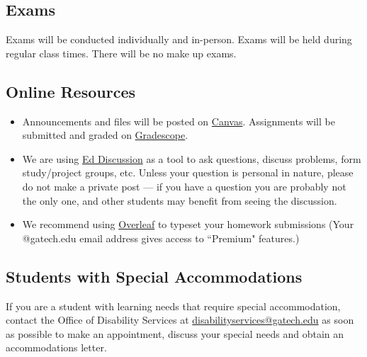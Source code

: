 \documentclass{article}
\begin{document}
\subsection*{Exams}
    Exams will be conducted individually and in-person. Exams will be held during regular class times. There will be no make up exams.

\subsection*{Online Resources}
    \begin{itemize}
        \item Announcements and files will be posted on \href{https://www.instructure.com/canvas}{Canvas}. Assignments will be submitted and graded on \href{https://www.gradescope.com/}{Gradescope}.
        \item We are using \href{https://edstem.org/}{Ed Discussion} as a tool to ask questions, discuss problems, form study/project groups, etc. Unless your question is personal in nature, please do not make a private post — if you have a question you are probably not the only one, and other students may benefit from seeing the discussion.
        \item We recommend using \href{https://overleaf.com}{Overleaf} to typeset your homework submissions (Your @gatech.edu email address gives access to ``Premium" features.)
    \end{itemize}

\subsection*{Students with Special Accommodations}
If you are a student with learning needs that require special accommodation, contact the Office of Disability Services at \url{disabilityservices@gatech.edu} as soon as possible to make an appointment, discuss your special needs and obtain an accommodations letter.

\pagebreak
\end{document}
